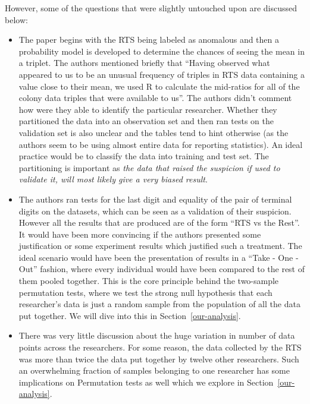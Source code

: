 \documentclass{article}
\begin{document}
However, some of the questions that were slightly untouched upon are discussed below:

\begin{itemize}
\item
  The paper begins with the RTS being labeled as anomalous and then a
  probability model is developed to determine the chances of seeing the
  mean in a triplet. The authors mentioned briefly that ``Having
  observed what appeared to us to be an unusual frequency of triples in
  RTS data containing a value close to their mean, we used R to
  calculate the mid-ratios for all of the colony data triples that were
  available to us''. The authors didn't comment how were they able to
  identify the particular researcher. Whether they partitioned the data
  into an observation set and then ran tests on the validation set is
  also unclear and the tables tend to hint otherwise (as the authors seem to be using almost entire data for reporting statistics). An ideal practice would be to classify the data into training and test set.
  The partitioning is important as \textit{the data that raised the suspicion if used to
  validate it, will most likely give a very biased result}.
\item
  The authors ran tests for the last digit and equality of the pair
  of terminal digits on the datasets, which can be seen as a validation
  of their suspicion. However all the results that are produced are of
  the form ``RTS vs the Rest''. It would have been more convincing if
  the authors presented some justification or some experiment results
  which justified such a treatment. The ideal scenario would have been
  the presentation of results in a ``Take - One - Out'' fashion, where every
  individual would have been compared to the rest of them pooled
  together. This is the core principle behind the two-sample permutation
  tests, where we test the strong null hypothesis that each researcher's
  data is just a random sample from the population of all the data put
  together. We will dive into this in Section~\ref{our-analysis}.
\item
  There was very little discussion about the huge variation in number of data points across the
  researchers. For some reason, the data collected by the RTS was more
  than twice the data put together by twelve other researchers. Such an
  overwhelming fraction of samples belonging to one researcher has some
  implications on Permutation tests as well which we explore in Section~\ref{our-analysis}.
\end{itemize}
\end{document}
